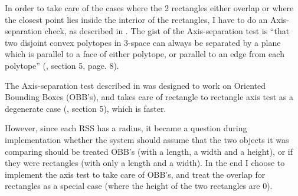 In order to take care of the cases where the 2 rectangles either overlap or where the closest point lies inside the interior of the rectangles, I have to do an Axis-separation check, as described in \cite{237244}. The gist of the Axis-separation test is ``that two disjoint convex polytopes in 3-space can always be separated by a plane which is parallel to a face of either polytope, or parallel to an edge from each polytope'' (\cite{237244}, section 5, page. 8).

The Axis-separation test described in \cite{237244} was designed to work on Oriented Bounding Boxes (OBB's), and takes care of rectangle to rectangle axis test as a degenerate case (\cite{237244}, section 5), which is faster. 

However, since each RSS has a radius, it became a question during implementation whether the system should assume that the two objects it was comparing should be treated OBB's (with a length, a width and a height), or if they were rectangles (with only a length and a width). In the end I choose to implement the axis test to take care of OBB's, and treat the overlap for rectangles as a special case (where the height of the two rectangles are 0).


